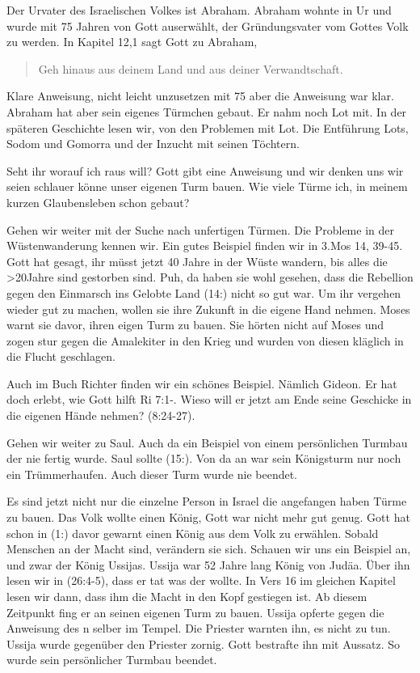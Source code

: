 \documentclass[14pt]{../../inc/mybib}
\renewcommand{\q}{\blockquote}[#1]{}
\begin{document}
    Der Urvater des Israelischen Volkes ist Abraham. Abraham wohnte in Ur und wurde mit 75 Jahren von Gott auserwählt, der Gründungsvater vom Gottes Volk zu werden. In Kapitel 12,1 sagt Gott zu Abraham, \q{Geh hinaus aus deinem Land und aus deiner Verwandtschaft.} Klare Anweisung, nicht leicht unzusetzen mit 75 aber die Anweisung war klar. Abraham hat aber sein eigenes Türmchen gebaut. Er nahm noch Lot mit. In der späteren Geschichte lesen wir, von den Problemen mit Lot. Die Entführung Lots, Sodom und Gomorra und der Inzucht mit seinen Töchtern.  
    
    Seht ihr worauf ich raus will? Gott gibt eine Anweisung und wir denken uns wir seien schlauer könne unser eigenen Turm bauen. Wie viele Türme ich, in meinem kurzen Glaubensleben schon gebaut?

    Gehen wir weiter mit der Suche nach unfertigen Türmen. Die Probleme in der Wüstenwanderung kennen wir. Ein gutes Beispiel finden wir in 3.Mos 14, 39-45. Gott hat gesagt, ihr müsst jetzt 40 Jahre in der Wüste wandern, bis alles die >20Jahre sind gestorben sind. Puh, da haben sie wohl gesehen, dass die Rebellion gegen den Einmarsch ins Gelobte Land (14:) nicht so gut war. Um ihr vergehen wieder gut zu machen, wollen sie ihre Zukunft in die eigene Hand nehmen. Moses warnt sie davor, ihren eigen Turm zu bauen. Sie hörten nicht auf Moses und zogen stur gegen die Amalekiter in den Krieg und wurden von diesen kläglich in die Flucht geschlagen.

    Auch im Buch Richter finden wir ein schönes Beispiel. Nämlich Gideon. Er hat doch erlebt, wie Gott hilft Ri 7:1-. Wieso will er jetzt am Ende seine Geschicke in die eigenen Hände nehmen? (8:24-27). 

    Gehen wir weiter zu Saul. Auch da ein Beispiel von einem persönlichen Turmbau der nie fertig wurde. Saul sollte (15:). Von da an war sein Königsturm nur noch ein Trümmerhaufen. Auch dieser Turm wurde nie beendet.

    Es sind jetzt nicht nur die einzelne Person in Israel die angefangen haben Türme zu bauen. Das Volk wollte einen König, Gott war nicht mehr gut genug. Gott hat schon in (1:) davor gewarnt einen König aus dem Volk zu erwählen. Sobald Menschen an der Macht sind, verändern sie sich. Schauen wir uns ein Beispiel an, und zwar der König Ussijas. Ussija war 52 Jahre lang König von Judäa. Über ihn lesen wir in (26:4-5), dass er tat was der \herr{} wollte. In Vers 16 im gleichen Kapitel lesen wir dann, dass ihm die Macht in den Kopf gestiegen ist. Ab diesem Zeitpunkt fing er an seinen eigenen Turm zu bauen. Ussija opferte gegen die Anweisung des \herr n selber im Tempel. Die Priester warnten ihn, es nicht zu tun. Ussija wurde gegenüber den Priester zornig. Gott bestrafte ihn mit Aussatz. So wurde sein persönlicher Turmbau beendet.
\end{document}

